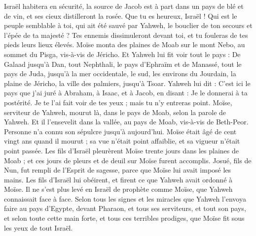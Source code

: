 \begin{multicols}{2}
Israël habitera en sécurité, la source de Jacob est à part dans un pays de blé et de vin, et ses cieux distilleront la rosée.
Que tu es heureux, Israël ! Qui est le peuple semblable à toi, qui ait été sauvé par Yahweh, le bouclier de ton secours et l'épée de ta majesté ? Tes ennemis dissimuleront devant toi, et tu fouleras de tes pieds leurs lieux élevés.
\VerseOne{}Moïse monta des plaines de Moab sur le mont Nebo, au sommet du Pisga, vis-à-vis de Jéricho. Et Yahweh lui fit voir tout le pays : De Galaad jusqu’à Dan,
tout Nephthali, le pays d'Ephraïm et de Manassé, tout le pays de Juda, jusqu'à la mer occidentale,
le sud, les environs du Jourdain, la plaine de Jéricho, la ville des palmiers, jusqu'à Tsoar.
Yahweh lui dit : C'est ici le pays que j'ai juré à Abraham, à Isaac, et à Jacob, en disant : Je le donnerai à ta postérité. Je te l'ai fait voir de tes yeux ; mais tu n'y entreras point.
Moïse, serviteur de Yahweh, mourut là, dans le pays de Moab, selon la parole de Yahweh.
Et il l'ensevelit dans la vallée, au pays de Moab, vis-à-vis de Beth-Peor. Personne n'a connu son sépulcre jusqu'à aujourd'hui.
Moïse était âgé de cent vingt ans quand il mourut ; sa vue n'était point affaiblie, et sa vigueur n'était point passée.
Les fils d'Israël pleurèrent Moïse trente jours dans les plaines de Moab ; et ces jours de pleurs et de deuil sur Moïse furent accomplis.
Josué, fils de Nun, fut rempli de l'Esprit de sagesse, parce que Moïse lui avait imposé les mains. Les fils d'Israël lui obéirent, et firent ce que Yahweh avait ordonné à Moïse.
Il ne s'est plus levé en Israël de prophète comme Moïse, que Yahweh connaissait face à face.
Selon tous les signes et les miracles que Yahweh l'envoya faire au pays d'Egypte, devant Pharaon, et tous ses serviteurs, et tout son pays,
et selon toute cette main forte, et tous ces terribles prodiges, que Moïse fit sous les yeux de tout Israël.
\PPE{}
\end{multicols}
